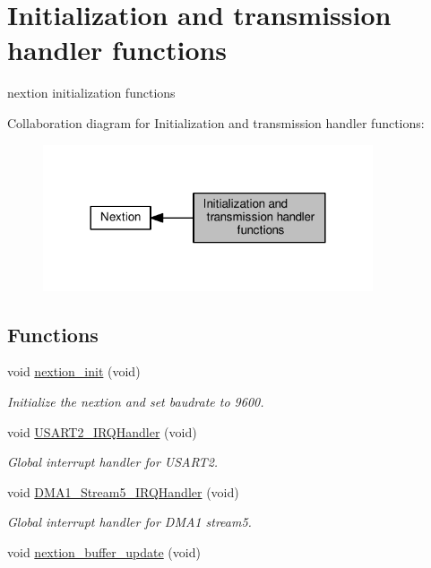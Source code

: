 \hypertarget{group__nextion___init}{}\section{Initialization and transmission handler functions}
\label{group__nextion___init}


nextion initialization functions  


Collaboration diagram for Initialization and transmission handler functions\+:\nopagebreak
\begin{figure}[H]
\begin{center}
\leavevmode
\includegraphics[width=276pt]{da/dcd/group__nextion___init}
\end{center}
\end{figure}
\subsection*{Functions}
\begin{DoxyCompactItemize}
\item 
void \hyperlink{group__nextion___init_ga954125e92a78b714cd63c21a481762a1}{nextion\+\_\+init} (void)
\begin{DoxyCompactList}\small\item\em Initialize the nextion and set baudrate to 9600. \end{DoxyCompactList}\item 
void \hyperlink{group__nextion___init_ga0ca6fd0e6f77921dd1123539857ba0a8}{U\+S\+A\+R\+T2\+\_\+\+I\+R\+Q\+Handler} (void)
\begin{DoxyCompactList}\small\item\em Global interrupt handler for U\+S\+A\+R\+T2. \end{DoxyCompactList}\item 
void \hyperlink{group__nextion___init_gac201b60d58b0eba2ce0b55710eb3c4d0}{D\+M\+A1\+\_\+\+Stream5\+\_\+\+I\+R\+Q\+Handler} (void)
\begin{DoxyCompactList}\small\item\em Global interrupt handler for D\+M\+A1 stream5. \end{DoxyCompactList}\item 
void \hyperlink{group__nextion___init_gae39a2c7ff1a319a65e808d8524ffcf18}{nextion\+\_\+buffer\+\_\+update} (void)
\end{DoxyCompactItemize}


